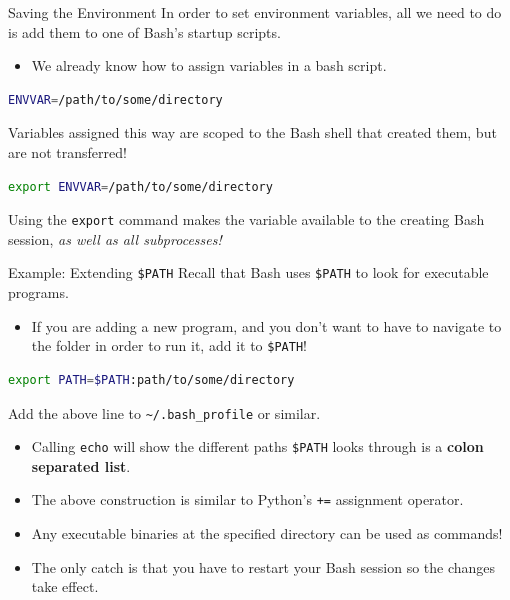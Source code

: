 \documentclass[11pt]{beamer}
\begin{document}
\begin{frame}[fragile=singleslide]{Saving the Environment}
In order to set environment variables, all we need to do is add them to one of Bash's startup scripts.
\begin{itemize}
\item We already know how to assign variables in a bash script.
\end{itemize}
\begin{lstlisting}[style=terminal, language=bash]
ENVVAR=/path/to/some/directory
\end{lstlisting}
Variables assigned this way are scoped to the Bash shell that created them, but are not transferred! 
\begin{lstlisting}[style=terminal, language=bash]
export ENVVAR=/path/to/some/directory
\end{lstlisting}
Using the \texttt{export} command makes the variable available to the creating Bash session, \emph{as well as all subprocesses!}
\end{frame}

\begin{frame}[fragile=singleslide]{Example: Extending \texttt{\$PATH}}
Recall that Bash uses \texttt{\$PATH} to look for executable programs.  
\begin{itemize}
\item If you are adding a new program, and you don't want to have to navigate to the folder in order to run it, add it to \texttt{\$PATH}!
\end{itemize}
\begin{lstlisting}[style=terminal, language=bash]
export PATH=$PATH:path/to/some/directory
\end{lstlisting}
Add the above line to \texttt{\textasciitilde/.bash\_profile} or similar. 
\begin{itemize}
\item Calling \texttt{echo} will show the different paths \texttt{\$PATH} looks through is a \textbf{colon separated list}.  
\item The above construction is similar to Python's \texttt{+=} assignment operator.
\item Any executable binaries at the specified directory can be used as commands! 
\item The only catch is that you have to restart your Bash session so the changes take effect.  
\end{itemize}
\end{frame}
\end{document}
